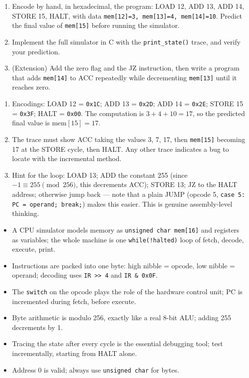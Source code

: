 \documentclass[11pt]{article}
\begin{document}
\begin{exercice}
\begin{enumerate}
\item Encode by hand, in hexadecimal, the program: LOAD 12, ADD 13, ADD 14, STORE 15, HALT, with data \texttt{mem[12]=3, mem[13]=4, mem[14]=10}. Predict the final value of \texttt{mem[15]} before running the simulator.
\item Implement the full simulator in C with the \texttt{print\_state()} trace, and verify your prediction.
\item (Extension) Add the zero flag and the JZ instruction, then write a program that adds \texttt{mem[14]} to ACC repeatedly while decrementing \texttt{mem[13]} until it reaches zero.
\end{enumerate}
\end{exercice}

\begin{corrige}[Exercise 1]
\begin{enumerate}
\item Encodings: LOAD 12 = \texttt{0x1C}; ADD 13 = \texttt{0x2D}; ADD 14 = \texttt{0x2E}; STORE 15 = \texttt{0x3F}; HALT = \texttt{0x00}. The computation is $3 + 4 + 10 = 17$, so the predicted final value is $\text{mem}[15] = 17$.
\item The trace must show ACC taking the values 3, 7, 17, then \texttt{mem[15]} becoming 17 at the STORE cycle, then HALT. Any other trace indicates a bug to locate with the incremental method.
\item Hint for the loop: LOAD 13; ADD the constant 255 (since $-1 \equiv 255 \pmod{256}$, this decrements ACC); STORE 13; JZ to the HALT address; otherwise jump back --- note that a plain JUMP (opcode 5, \texttt{case 5: PC = operand; break;}) makes this easier. This is genuine assembly-level thinking.
\end{enumerate}
\end{corrige}

\begin{aretenir}
\begin{itemize}
\item A CPU simulator models memory as \texttt{unsigned char mem[16]} and registers as variables; the whole machine is one \texttt{while(!halted)} loop of fetch, decode, execute, print.
\item Instructions are packed into one byte: high nibble = opcode, low nibble = operand; decoding uses \texttt{IR >> 4} and \texttt{IR \& 0x0F}.
\item The \texttt{switch} on the opcode plays the role of the hardware control unit; PC is incremented during fetch, before execute.
\item Byte arithmetic is modulo 256, exactly like a real 8-bit ALU; adding 255 decrements by 1.
\item Tracing the state after every cycle is the essential debugging tool; test incrementally, starting from HALT alone.
\item Address 0 is valid; always use \texttt{unsigned char} for bytes.
\end{itemize}
\end{aretenir}
\end{document}
